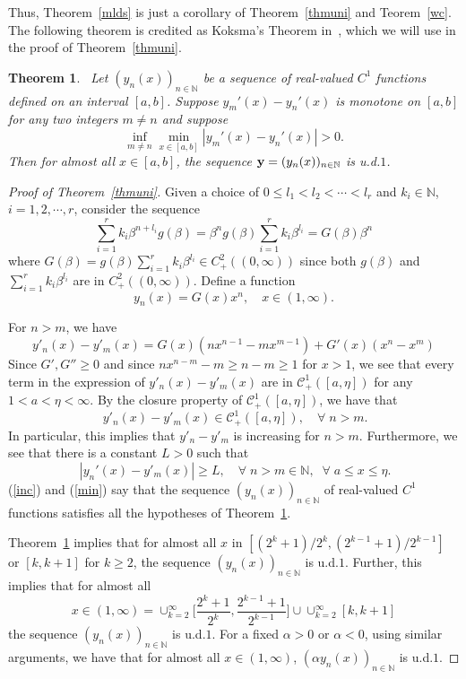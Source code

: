 \documentclass[12pt,letterpaper]{amsart}
\newtheorem{thmx}{Theorem}
\newcommand {\N} {{\mathbb N}}
\begin{document}
Thus, Theorem~\ref{mlds} is just a corollary of Theorem~\ref{thmuni} and Teorem~\ref{wc}. 
The following theorem is credited as Koksma's Theorem in~\cite{KN}, which we will use in the proof of Theorem~\ref{thmuni}.

\medskip
\begin{thmx}~\label{kth}
Let $(y_{n}(x))_{n\in \N}$ be a sequence of real-valued $C^{1}$ functions defined on an interval $[a,b]$. 
Suppose $y_{m}'(x)-y_{n}'(x)$ is monotone on $[a,b]$ for any two integers $m\not=n$ 
and suppose 
$$
\inf_{m\not=n}\min_{x\in [a,b]} |y_{m}'(x)-y_{n}'(x)| >0.
$$
Then for almost all $x\in [a,b]$, the sequence ${\bf y} = (y_{n}(x))_{n\in \N}$ is u.d.$1$.
\end{thmx}

\begin{proof}[Proof of Theorem~\ref{thmuni}]
Given a choice of $0\leq l_{1} <l_{2}< \cdots <l_{r}$ and $k_{i}\in \N$, $i=1, 2, \cdots, r$, consider the sequence 
 $$
\sum_{i=1}^{r} k_{i} \beta^{n+l_{i}}g(\beta) = \beta^{n}g(\beta) \sum_{i=1}^{r} k_{i} \beta^{l_{i}}=G(\beta) \beta^{n}
$$
where $G(\beta) =g(\beta) \sum_{i=1}^{r} k_{i} \beta^{l_{i}}\in C^{2}_{+}((0, \infty))$ since both $g(\beta)$ and $\sum_{i=1}^{r} k_{i} \beta^{l_{i}}$ are in $C^{2}_{+}((0, \infty))$.
Define a function 
$$
y_n(x)= G(x) x^n , \quad x\in (1, \infty).
$$ 

For $n>m$, we have
$$
y'_n(x)-y'_m(x)= G(x)(n x^{n-1}-m x^{m-1})+G'(x)(x^n-x^m)
$$
Since $G', G''\geq 0$ and since $n x^{n-m}-m\ge n-m\ge 1$ for $x> 1$,
we see that every term in the expression of $y'_n(x)-y'_m(x)$ are in $\mathcal{C}^{1}_{+}([a,\eta])$ 
for any $1<a<\eta<\infty$. 
By the closure property of $\mathcal{C}^{1}_{+}([a,\eta])$, we have that 
\begin{equation}~\label{inc}
y'_n(x)-y'_m(x)\in \mathcal{C}^{1}_{+}([a, \eta]), \quad \forall\; n>m. 
\end{equation}
In particular, this implies that $y'_n-y'_m$ is increasing for $n>m$.
Furthermore, we see that there is a constant $L>0$ such that
\begin{equation}~\label{min}
|y_n'(x)-y'_m(x)|\ge L, \quad \forall\; n>m\in \N, \;\; \forall\; a \leq x\leq \eta. 
\end{equation}
(\ref{inc}) and (\ref{min}) say that the sequence $(y_{n}(x))_{n\in \N}$ of real-valued $C^{1}$ functions satisfies all the hypotheses of Theorem~\ref{kth}. 

Theorem~\ref{kth} implies that for almost all $x$ in $[(2^{k}+1)/2^{k}, (2^{k-1}+1)/2^{k-1}]$ or $[k, k+1]$ for $k\geq 2$, the sequence 
$(y_n(x))_{n\in \N}$ is u.d.$1$. Further, this implies that for almost all 
$$
x\in (1, \infty)= \cup_{k=2}^{\infty} \Big[\frac{2^{k}+1}{2^{k}}, \frac{2^{k-1}+1}{2^{k-1}}\Big]\cup \cup_{k=2}^{\infty} [k, k+1]
$$ 
the sequence 
$(y_n(x))_{n\in \N}$ is u.d.$1$. For a fixed $\alpha >0$ or $\alpha <0$, using similar arguments, we have that for almost all $x\in (1, \infty)$, $(\alpha y_n(x))_{n\in \N}$ is u.d.$1$. 


\end{proof}
\end{document}
